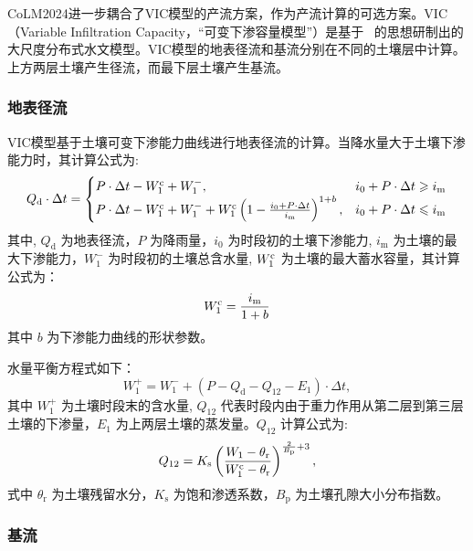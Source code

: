 CoLM2024进一步耦合了VIC模型的产流方案，作为产流计算的可选方案。VIC（Variable Infiltration Capacity，“可变下渗容量模型”）是基于~\citet{liang1994simple} 的思想研制出的大尺度分布式水文模型。VIC模型的地表径流和基流分别在不同的土壤层中计算。上方两层土壤产生径流，而最下层土壤产生基流。

\subsubsection{地表径流}

    VIC模型基于土壤可变下渗能力曲线进行地表径流的计算。当降水量大于土壤下渗能力时，其计算公式为:
    \begin{equation}
      Q_{\mathrm {d}} \cdot\Delta t=
      \begin{cases}
        P\cdot\Delta t - W_1^{\rm c} + W_1^-, & i_0 + P\cdot\Delta t \geqslant i_{\mathrm {m}}  \\
        P\cdot\Delta t - W_1^{\rm c} + W_1^- + W_1^{\rm c} \left(1-\frac{i_0+P\cdot\Delta t}{i_{\mathrm {m}} } \right)^{1+b}, & i_0 + P\cdot\Delta t \leqslant i_{\mathrm {m}}
      \end{cases}
    \end{equation}
    其中, $Q_{\mathrm {d}} $ 为地表径流，$P$ 为降雨量，$i_0$ 为时段初的土壤下渗能力, $i_{\mathrm {m}} $ 为土壤的最大下渗能力，$W_1^-$ 为时段初的土壤总含水量, $W_1^{\rm c}$ 为土壤的最大蓄水容量，其计算公式为：
    \begin{equation}
      W_1^{\rm c} = \frac{i_{\mathrm {m}} }{1+b}
    \end{equation}
    其中 $b$ 为下渗能力曲线的形状参数。

    水量平衡方程式如下：
    \begin{equation}
      W_1^+ = W_1^- + (P - Q_{\mathrm {d}}  - Q_{12} - E_1)\cdot\Delta t,
    \end{equation}
    其中 $W_1^+$ 为土壤时段末的含水量, $Q_{12}$ 代表时段内由于重力作用从第二层到第三层土壤的下渗量，$E_1$ 为上两层土壤的蒸发量。$Q_{12}$ 计算公式为:
    \begin{equation}
      Q_{12} = K_{\mathrm {s}}  \left(\frac{W_1-\theta_{\mathrm {r}} }{W_1^{\rm c}-\theta_{\mathrm {r}} }\right)^{\frac{2}{B_{\mathrm {p}} } + 3},
    \end{equation}
    式中 $\theta_{\mathrm {r}} $ 为土壤残留水分，$K_{\mathrm {s}} $ 为饱和渗透系数，$B_{\mathrm {p}} $ 为土壤孔隙大小分布指数。

\subsubsection{基流}

